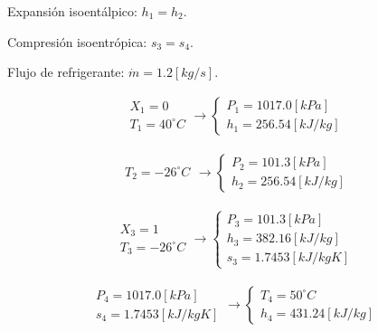 \documentclass[letter,10pt]{article}
\begin{document}
\begin{enumerate}
Expansión isoentálpico: $h_1 = h_2$.

Compresión isoentrópica: $s_3 = s_4$.

Flujo de refrigerante: $\dot{m}=1.2[kg/s]$.

\begin{eqnarray*}
    \begin{array}{c}
        X_1 = 0 \\
        T_1 = 40^\circ C
    \end{array}
    \rightarrow
    \begin{cases}
        P_1 = 1017.0[kPa] \\
        h_1 = 256.54[kJ/kg]
    \end{cases}
\end{eqnarray*}

\begin{eqnarray*}
    \begin{array}{c}
        T_2 = -26^\circ C
    \end{array}
    \rightarrow
    \begin{cases}
        P_2 = 101.3[kPa] \\
        h_2 = 256.54[kJ/kg]
    \end{cases}
\end{eqnarray*}

\begin{eqnarray*}
    \begin{array}{c}
        X_3 = 1 \\
        T_3 = -26^\circ C
    \end{array}
    \rightarrow
    \begin{cases}
        P_3 = 101.3[kPa] \\
        h_3 = 382.16[kJ/kg] \\
        s_3 = 1.7453[kJ/kg K]
    \end{cases}
\end{eqnarray*}

\begin{eqnarray*}
    \begin{array}{c}
        P_4 = 1017.0[kPa] \\
        s_4 = 1.7453[kJ/kg K]
    \end{array}
    \rightarrow
    \begin{cases}
        T_4 = 50^\circ C \\
        h_4 = 431.24[kJ/kg]
    \end{cases}
\end{eqnarray*}


\end{enumerate}
\end{document}
